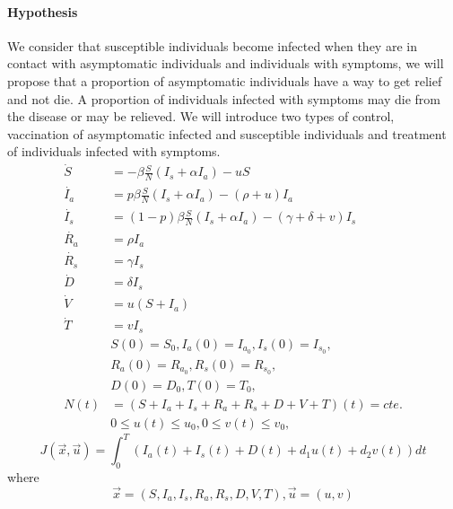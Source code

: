 \documentclass[a4paper,10pt]{amsart}
\begin{document}
        \paragraph{Hypothesis} We consider that susceptible individuals become 
        infected when they are in contact with asymptomatic individuals and
        individuals with symptoms, we will propose that a proportion of 
        asymptomatic individuals have a way to get relief and not die. A 
        proportion of individuals infected with symptoms may die from the 
        disease or may be relieved. We will introduce two types of control, 
        vaccination of asymptomatic infected and susceptible individuals and 
        treatment of individuals infected with symptoms. 
        \begin{equation}
            \begin{aligned}
                \dot{S}  &= 
                    - \beta \frac{S}{N}(I_s+\alpha I_a) - u S
                \\
                \dot{I_a}  &= 
                    p\beta \frac{S}{N}(I_s + \alpha I_a) - (\rho + u)I_a
                 \\
                \dot{I_s} &=
                    (1 - p) \beta \frac{S}{N} (I_s + \alpha I_a) -
                    (\gamma + \delta + v)I_s
                \\
                \dot{R_a} &= 
                    \rho I_a
                \\
                \dot{R_s} &=
                    \gamma I_s
                \\
                \dot{D} &=
                    \delta I_s
                \\
                \dot{V} &=
                    u(S+I_a)
                \\
                \dot{T} &=
                    v I_s
                \\
                 &
                     S(0) = S_0, 
                     I_a(0) =I_{a_0}, 
                     I_s(0) = I_{s_0}, 
                \\
                 &
                     R_a(0)= R_{a_0}, 
                     R_s(0)= R_{s_0},
                \\
                 &
                     D(0) = D_0,
                     T(0) = T_0,
                \\
                N(t) &= (S+I_a+I_s+R_a+R_s+D+V+T)(t) = cte.           
                \\
                &
                0\leq u(t)\leq u_0, 0\leq v(t)\leq v_0,
            \end{aligned}
        \end{equation}
	\begin{equation}
		J(\vec{x},\vec{u}) = \int^T_0 (I_a(t)+I_s(t)+D(t)+d_1 u(t)+d_2v(t))dt
	\end{equation}
	where 
	\begin{equation*}
	\vec{x}=(S,I_a,I_s,R_a,R_s,D,V,T),\vec{u} =(u,v)
	\end{equation*}
\end{document}
